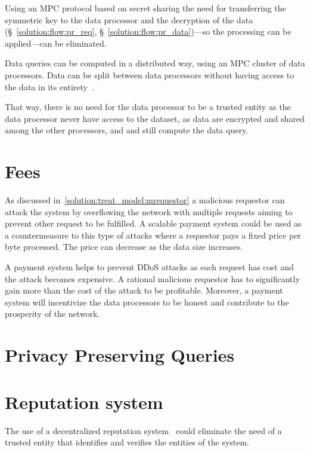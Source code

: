 Using an MPC protocol based on secret sharing the need for transferring the symmetric key to the data processor and the decryption of the data (§~\ref{solution:flow:pr_req}, §~\ref{solution:flow:pr_data})---so the processing can be applied---can be eliminated.

Data queries can be computed in a distributed way, using an MPC cluster of data processors. Data can be split between data processors without having access to the data in its entirety~\cite{DBLP:journals/corr/ZyskindNP15}.

That way, there is no need for the data processor to be a trusted entity as the data processor never have access to the dataset, as data are encrypted and shared among the other processors, and and still compute the data query.

\section{Fees}
\label{future_work:fees}

As discussed in~\ref{solution:treat_model:mrequestor} a malicious requestor can attack the system by overflowing the network with multiple requests aiming to prevent other request to be fulfilled. A scalable payment system could be used as a countermeasure to this type of attacks where a requestor pays a fixed price per byte processed. The price can decrease as the data size increases.

A payment system helps to prevent DDoS attacks as each request has cost and the attack becomes expensive. A rational malicious requestor has to significantly gain more than the cost of the attack to be profitable. Moreover, a payment system will incentivize the data processors to be honest and contribute to the prosperity of the network.

\section{Privacy Preserving Queries}
\label{future_work:ppq}

\section{Reputation system}
\label{future_work:ranking_system}

The use of a decentralized reputation system~\cite{trust_is_risk} could eliminate the need of a trusted entity that identifies and verifies the entities of the system.

